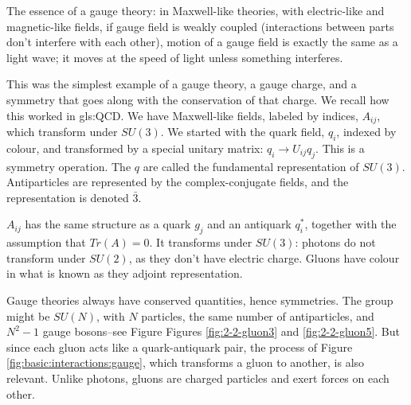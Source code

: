 \documentclass[]{article}
\begin{document}
The essence of a gauge theory: in Maxwell-like theories, with electric-like and magnetic-like fields, if gauge field is weakly coupled (interactions between parts don't interfere with each other), motion of a gauge field is exactly the same as a light wave; it moves at the speed of light unless something interferes.
 
This was the simplest example of a gauge theory, a gauge charge, and a symmetry that goes along with the conservation of that charge. We recall how this worked in \gls{gls:QCD}. We have Maxwell-like fields, labeled by indices, $A_{ij}$, which transform under $SU(3)$. We started with the quark field, $q_i$, indexed by colour, and transformed by a special unitary matrix: $q_i \rightarrow U_{ij} q_j$. This is a symmetry operation. The $q$ are called the fundamental representation of $SU(3)$.
Antiparticles are represented by the complex-conjugate fields, and the representation is denoted $\bar{3}$.

$A_{ij}$ has the same structure as a quark $g_j$ and an antiquark $q^*_i$, together with the assumption that $Tr(A)=0$. It transforms under $SU(3)$: photons do not transform under $SU(2)$, as they don't have electric charge. Gluons have colour in what is known as they adjoint representation.


Gauge theories  always have conserved quantities, hence symmetries. The group might be $SU(N)$, with $N$ particles, the same number of antiparticles, and $N^2-1$ gauge bosons--see Figure Figures \ref{fig:2-2-gluon3} and \ref{fig:2-2-gluon5}. But since each gluon acts like a quark-antiquark pair, the process of Figure \ref{fig:basic:interactions:gauge}, which transforms a gluon to another, is also relevant. Unlike photons, gluons are charged particles and exert forces on each other.
\end{document}
